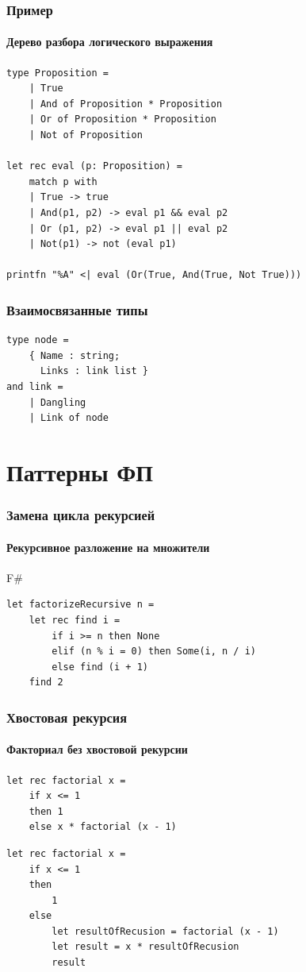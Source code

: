\documentclass[xetex,mathserif,serif]{beamer}
\begin{document}
	\begin{frame}[fragile]
		\frametitle{Пример}
		\framesubtitle{Дерево разбора логического выражения}
		\begin{verbatim}
type Proposition =
    | True
    | And of Proposition * Proposition
    | Or of Proposition * Proposition
    | Not of Proposition

let rec eval (p: Proposition) =
    match p with
    | True -> true
    | And(p1, p2) -> eval p1 && eval p2
    | Or (p1, p2) -> eval p1 || eval p2
    | Not(p1) -> not (eval p1)

printfn "%A" <| eval (Or(True, And(True, Not True)))
		\end{verbatim}
\end{frame}

	\begin{frame}[fragile]
		\frametitle{Взаимосвязанные типы}
		\begin{verbatim}
type node =
    { Name : string;
      Links : link list }
and link =
    | Dangling
    | Link of node
		\end{verbatim}
\end{frame}

	\section{Паттерны ФП}

	\begin{frame}[fragile]
		\frametitle{Замена цикла рекурсией}
		\framesubtitle{Рекурсивное разложение на множители}
		\begin{exampleblock}{F\#}
			\begin{verbatim}
let factorizeRecursive n =
    let rec find i =
        if i >= n then None
        elif (n % i = 0) then Some(i, n / i)
        else find (i + 1)
    find 2
			\end{verbatim}
		\end{exampleblock}
\end{frame}

	\begin{frame}[fragile]
		\frametitle{{Хвостовая рекурсия}}
		\framesubtitle{Факториал без хвостовой рекурсии}
		\begin{verbatim}
let rec factorial x =
    if x <= 1
    then 1 
    else x * factorial (x - 1)
		\end{verbatim}

		\begin{verbatim}
let rec factorial x =
    if x <= 1
    then
        1
    else
        let resultOfRecusion = factorial (x - 1)
        let result = x * resultOfRecusion
        result
		\end{verbatim}
\end{frame}
\end{document}
